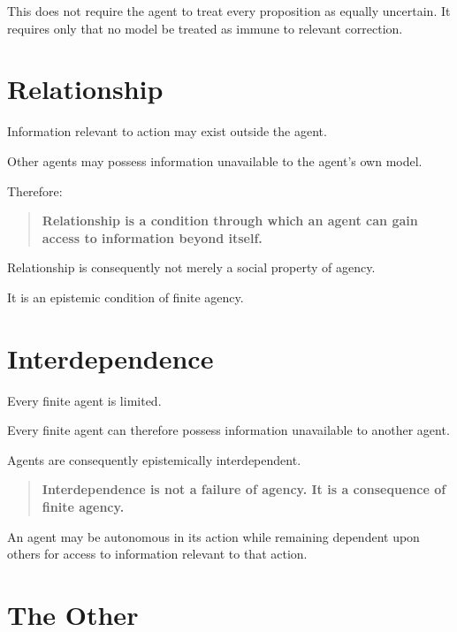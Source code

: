 \documentclass[11pt,a4paper]{article}
\begin{document}
This does not require the agent to treat every proposition as equally
uncertain. It requires only that no model be treated as immune to relevant
correction.


\section{Relationship}

Information relevant to action may exist outside the agent.

Other agents may possess information unavailable to the agent's own model.

Therefore:

\begin{quote}
\textbf{Relationship is a condition through which an agent can gain access
to information beyond itself.}
\end{quote}

Relationship is consequently not merely a social property of agency.

It is an epistemic condition of finite agency.


\section{Interdependence}

Every finite agent is limited.

Every finite agent can therefore possess information unavailable to another
agent.

Agents are consequently epistemically interdependent.

\begin{quote}
\textbf{Interdependence is not a failure of agency. It is a consequence of
finite agency.}
\end{quote}

An agent may be autonomous in its action while remaining dependent upon
others for access to information relevant to that action.


\section{The Other}
\end{document}
